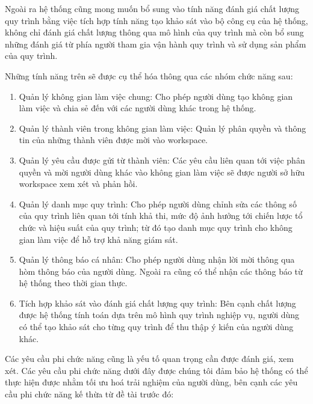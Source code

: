 Ngoài ra hệ thống cũng mong muốn bổ sung vào tính năng đánh giá chất lượng quy trình bằng việc tích hợp tính năng tạo khảo sát vào bộ công cụ của hệ thống, không chỉ đánh giá chất lượng thông qua mô hình của quy trình mà còn bổ sung những đánh giá từ phía người tham gia vận hành quy trình và sử dụng sản phẩm của quy trình.
\par
Những tính năng trên sẽ được cụ thể hóa thông qua các nhóm chức năng sau:
\begin{enumerate}
      \item Quản lý không gian làm việc chung: Cho phép người dùng tạo không gian làm việc và chia sẻ đến với các người dùng khác trong hệ thống.
      \item Quản lý thành viên trong không gian làm việc: Quản lý phân quyền và thông tin của những thành viên được mời vào workspace.
      \item Quản lý yêu cầu được gửi từ thành viên: Các yêu cầu liên quan tới việc phân quyền và mời người dùng khác vào không gian làm việc sẽ được người sở hữu workspace xem xét và phản hồi.
      \item Quản lý danh mục quy trình: Cho phép người dùng chỉnh sửa các thông số của quy trình liên quan tới tính khả thi, mức độ ảnh hưởng tới chiến lược tổ chức và hiệu suất của quy trình; từ đó tạo danh mục quy trình cho không gian làm việc để hỗ trợ khả năng giám sát.
      \item Quản lý thông báo cá nhân: Cho phép người dùng nhận lời mời thông qua hòm thông báo của người dùng. Ngoài ra cũng có thể nhận các thông báo từ hệ thống theo thời gian thực.
      \item Tích hợp khảo sát vào đánh giá chất lượng quy trình: Bên cạnh chất lượng được hệ thống tính toán dựa trên mô hình quy trình nghiệp vụ, người dùng có thể tạo khảo sát cho từng quy trình để thu thập ý kiến của người dùng khác.
\end{enumerate}
\par
Các yêu cầu phi chức năng cũng là yếu tố quan trọng cần được đánh giá, xem xét. Các yêu cầu phi chức năng dưới đây được chúng tôi đảm bảo hệ thống có thể thực hiện được nhằm tối ưu hoá trải nghiệm của người dùng, bên cạnh các yêu cầu phi chức năng kế thừa từ đề tài trước đó:

